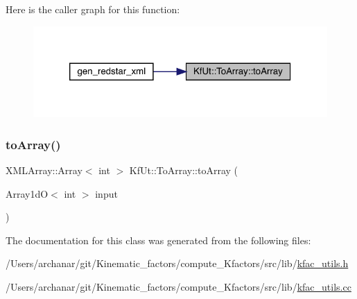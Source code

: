 Here is the caller graph for this function\+:\nopagebreak
\begin{figure}[H]
\begin{center}
\leavevmode
\includegraphics[width=320pt]{d3/dec/classKfUt_1_1ToArray_ac97892c7b8ae265fe9d91d3f823b3f98_icgraph}
\end{center}
\end{figure}
\mbox{\label{classKfUt_1_1ToArray_a272ebce4969f38835c7a503a85a4f8d3}} 
\subsubsection{\texorpdfstring{toArray()}{toArray()}\hspace{0.1cm}{\footnotesize\ttfamily [2/2]}}
{\footnotesize\ttfamily X\+M\+L\+Array\+::\+Array$<$ int $>$ Kf\+Ut\+::\+To\+Array\+::to\+Array (\begin{DoxyParamCaption}\item[{Array1dO$<$ int $>$}]{input }\end{DoxyParamCaption})\hspace{0.3cm}{\ttfamily [static]}}



The documentation for this class was generated from the following files\+:\begin{DoxyCompactItemize}
\item 
/\+Users/archanar/git/\+Kinematic\+\_\+factors/compute\+\_\+\+Kfactors/src/lib/\mbox{\hyperlink{kfac__utils_8h}{kfac\+\_\+utils.\+h}}\item 
/\+Users/archanar/git/\+Kinematic\+\_\+factors/compute\+\_\+\+Kfactors/src/lib/\mbox{\hyperlink{kfac__utils_8cc}{kfac\+\_\+utils.\+cc}}\end{DoxyCompactItemize}
